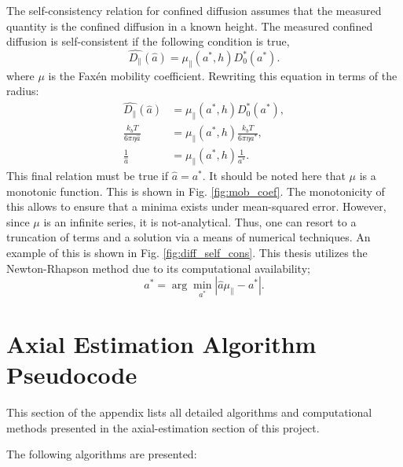 The self-consistency relation for confined diffusion assumes that the measured quantity is the confined diffusion in a known height. The measured confined diffusion is self-consistent if the following condition is true,
\begin{equation}
    \hat{D_\parallel}(\hat{a}) = \mu_\parallel(a^*,h) D^*_0(a^*).
\end{equation}
where $\mu$ is the Faxén mobility coefficient. Rewriting this equation in terms of the radius:
\begin{align*}
    \hat{D_\parallel}(\hat{a}) &= \mu_\parallel(a^*,h) D^*_0(a^*), \\
    \frac{k_b T}{6\pi \eta \hat{a}} &= \mu_\parallel(a^*,h) \frac{k_b T}{6\pi \eta a^*}, \\
    \frac{1}{\hat{a}} &= \mu_\parallel(a^*,h) \frac{1}{a^*}.
\end{align*}
This final relation must be true if $\hat{a} = a^*$. It should be noted here that $\mu$ is a monotonic function. This is shown in Fig. \ref{fig:mob_coef}. The monotonicity of this allows to ensure that a minima exists under mean-squared error. However, since $\mu$ is an infinite series, it is not-analytical. Thus, one can resort to a truncation of terms and a solution via a means of numerical techniques. An example of this is shown in Fig. \ref{fig:diff_self_cons}. This thesis utilizes the Newton-Rhapson method due to its computational availability;
\begin{equation}
    a^* = \arg\min_{a^*}\left|\hat{a} \mu_\parallel - a^*\right|.
\end{equation}


\clearpage
\chapter{Axial Estimation Algorithm Pseudocode}

This section of the appendix lists all detailed algorithms and computational methods presented in the axial-estimation section of this project.

The following algorithms are presented:

